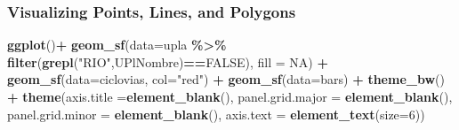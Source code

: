 \documentclass[
  shownotes,
  xcolor={svgnames},
  hyperref={colorlinks,citecolor=DarkBlue,linkcolor=DarkRed,urlcolor=DarkBlue}
   , aspectratio=169]{beamer}
\newenvironment{Shaded}{\begin{snugshade}}{\end{snugshade}}
\newcommand{\DataTypeTok}[1]{\textcolor[rgb]{0.13,0.29,0.53}{#1}}
\newcommand{\DecValTok}[1]{\textcolor[rgb]{0.00,0.00,0.81}{#1}}
\newcommand{\KeywordTok}[1]{\textcolor[rgb]{0.13,0.29,0.53}{\textbf{#1}}}
\newcommand{\NormalTok}[1]{#1}
\newcommand{\OperatorTok}[1]{\textcolor[rgb]{0.81,0.36,0.00}{\textbf{#1}}}
\newcommand{\OtherTok}[1]{\textcolor[rgb]{0.56,0.35,0.01}{#1}}
\newcommand{\StringTok}[1]{\textcolor[rgb]{0.31,0.60,0.02}{#1}}
\begin{document}
\begin{frame}[fragile]
\frametitle{Visualizing Points, Lines, and Polygons}


\begin{minipage}[t]{0.52\linewidth}
        \begin{scriptsize}
\begin{Shaded}
\begin{Highlighting}[]
\KeywordTok{ggplot}\NormalTok{()}\OperatorTok{+}
\StringTok{  }\KeywordTok{geom\_sf}\NormalTok{(}\DataTypeTok{data=}\NormalTok{upla }
\OperatorTok{\%\textgreater{}\%}\StringTok{ }\KeywordTok{filter}\NormalTok{(}\KeywordTok{grepl}\NormalTok{(}\StringTok{"RIO"}\NormalTok{,UPlNombre)}\OperatorTok{==}\OtherTok{FALSE}\NormalTok{), }
\DataTypeTok{fill =} \OtherTok{NA}\NormalTok{) }\OperatorTok{+}
\StringTok{  }\KeywordTok{geom\_sf}\NormalTok{(}\DataTypeTok{data=}\NormalTok{ciclovias, }\DataTypeTok{col=}\StringTok{"red"}\NormalTok{) }\OperatorTok{+}
\StringTok{  }\KeywordTok{geom\_sf}\NormalTok{(}\DataTypeTok{data=}\NormalTok{bars) }\OperatorTok{+}
\StringTok{  }\KeywordTok{theme\_bw}\NormalTok{() }\OperatorTok{+}
\StringTok{  }\KeywordTok{theme}\NormalTok{(}\DataTypeTok{axis.title =}\KeywordTok{element\_blank}\NormalTok{(),}
        \DataTypeTok{panel.grid.major =} \KeywordTok{element\_blank}\NormalTok{(),}
        \DataTypeTok{panel.grid.minor =} \KeywordTok{element\_blank}\NormalTok{(),}
        \DataTypeTok{axis.text =} \KeywordTok{element\_text}\NormalTok{(}\DataTypeTok{size=}\DecValTok{6}\NormalTok{))}
\end{Highlighting}
\end{Shaded}
  \end{scriptsize}
    \end{minipage}
    \hfill
    \begin{minipage}[t]{0.43\linewidth}%
       \medskip
        \begin{figure}[H] \centering
            \captionsetup{justification=centering}

\end{figure}
\end{minipage}
\end{frame}
\end{document}
